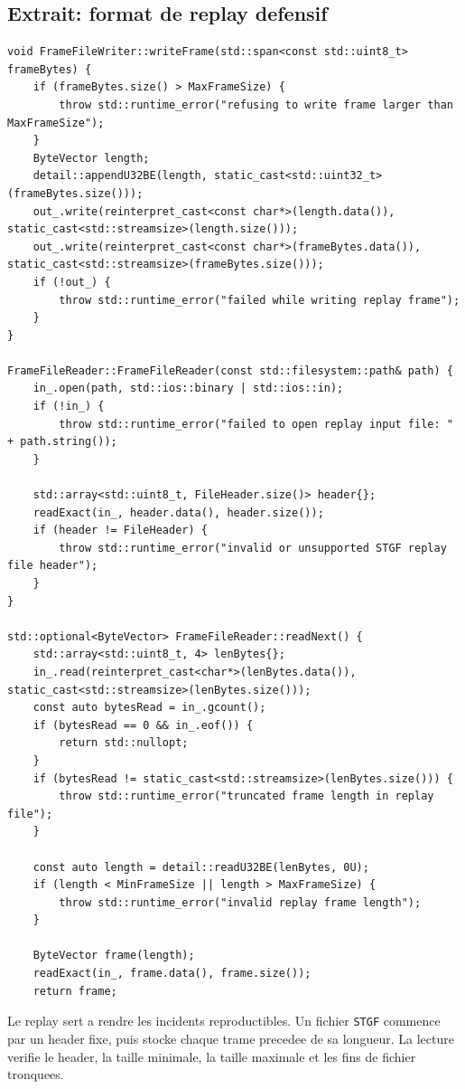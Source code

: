 \documentclass[10pt,a4paper]{article}
\begin{document}
\subsection{Extrait: format de replay defensif}
\begin{lstlisting}[caption={Lecture et ecriture de fichiers STGF}]
void FrameFileWriter::writeFrame(std::span<const std::uint8_t> frameBytes) {
    if (frameBytes.size() > MaxFrameSize) {
        throw std::runtime_error("refusing to write frame larger than MaxFrameSize");
    }
    ByteVector length;
    detail::appendU32BE(length, static_cast<std::uint32_t>(frameBytes.size()));
    out_.write(reinterpret_cast<const char*>(length.data()), static_cast<std::streamsize>(length.size()));
    out_.write(reinterpret_cast<const char*>(frameBytes.data()), static_cast<std::streamsize>(frameBytes.size()));
    if (!out_) {
        throw std::runtime_error("failed while writing replay frame");
    }
}

FrameFileReader::FrameFileReader(const std::filesystem::path& path) {
    in_.open(path, std::ios::binary | std::ios::in);
    if (!in_) {
        throw std::runtime_error("failed to open replay input file: " + path.string());
    }

    std::array<std::uint8_t, FileHeader.size()> header{};
    readExact(in_, header.data(), header.size());
    if (header != FileHeader) {
        throw std::runtime_error("invalid or unsupported STGF replay file header");
    }
}

std::optional<ByteVector> FrameFileReader::readNext() {
    std::array<std::uint8_t, 4> lenBytes{};
    in_.read(reinterpret_cast<char*>(lenBytes.data()), static_cast<std::streamsize>(lenBytes.size()));
    const auto bytesRead = in_.gcount();
    if (bytesRead == 0 && in_.eof()) {
        return std::nullopt;
    }
    if (bytesRead != static_cast<std::streamsize>(lenBytes.size())) {
        throw std::runtime_error("truncated frame length in replay file");
    }

    const auto length = detail::readU32BE(lenBytes, 0U);
    if (length < MinFrameSize || length > MaxFrameSize) {
        throw std::runtime_error("invalid replay frame length");
    }

    ByteVector frame(length);
    readExact(in_, frame.data(), frame.size());
    return frame;
\end{lstlisting}


Le replay sert a rendre les incidents reproductibles. Un fichier \texttt{STGF} commence par un header fixe, puis stocke chaque trame precedee de sa longueur. La lecture verifie le header, la taille minimale, la taille maximale et les fins de fichier tronquees.
\end{document}
